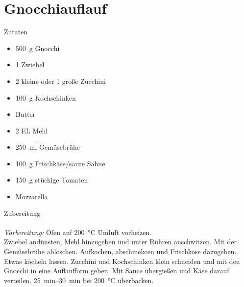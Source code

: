 \section*{Gnocchiauflauf}
\ihead{}\ohead{}
\cfoot{}
{\Large Zutaten}
\begin{multicols}{2}
\begin{itemize}
    \item \SI{500}{g} Gnocchi
    \item \num{1} Zwiebel
    \item \num{2} kleine oder \num{1} große Zucchini
    \item \SI{100}{g} Kochschinken
    \item Butter
    \item \num{2} EL Mehl
    \item \SI{250}{ml} Gemüsebrühe
    \item \SI{100}{g} Frischkäse/saure Sahne
    \item \SI{150}{g} stückige Tomaten
    \item Mozzarella
\end{itemize}
\end{multicols}
\noindent
{\Large Zubereitung}\\
\\
\textit{Vorbereitung:} Ofen auf \SI{200}{\celsius} Umluft vorheizen.\\
Zwiebel andünsten, Mehl hinzugeben und unter Rühren anschwitzen. 
Mit der Gemüsebrühe ablöschen.
Aufkochen, abschmekcen und Frischköse dazugeben.
Etwas köcheln lassen.
Zucchini und Kochschinken klein schneiden und mit den Gnocchi in eine Auflaufform geben.
Mit Sauce übergießen und Käse darauf verteilen.
\SIrange{25}{30}{min} bei \SI{200}{\celsius} überbacken.